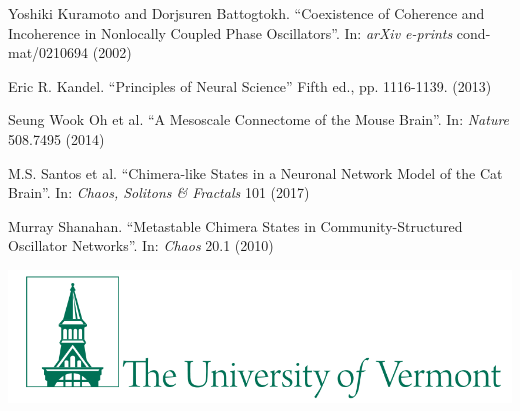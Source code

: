 \documentclass{beamer}
\begin{document}
\begin{frame}[t]
\begin{multicols}{3}
\begin{thebibliography}{99}
     Yoshiki Kuramoto and Dorjsuren Battogtokh. ``Coexistence of Coherence and Incoherence in Nonlocally Coupled Phase Oscillators''.
      In: \textit{arXiv e-prints} cond-mat/0210694 (2002)

     Eric R. Kandel. ``Principles of Neural Science'' Fifth ed., pp. 1116-1139. (2013)

     Seung Wook Oh et al. ``A Mesoscale Connectome of the Mouse Brain''.
      In: \textit{Nature} 508.7495 (2014)

     M.S. Santos et al. ``Chimera-like States in a Neuronal Network Model of the Cat Brain''.
      In: \textit{Chaos, Solitons \& Fractals} 101 (2017)

     Murray Shanahan. ``Metastable Chimera States in Community-Structured Oscillator Networks''.
      In: \textit{Chaos} 20.1 (2010)

    \end{thebibliography}


    \vspace{\fill}
    \includegraphics[width=\columnwidth]{figure/UVM}
  \end{multicols}

\end{frame}
\end{document}
